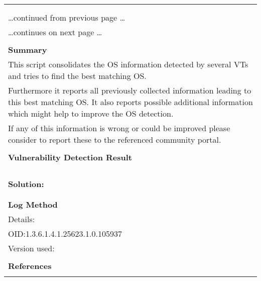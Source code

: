 \documentclass{article}
\begin{document}
\begin{longtable}{|p{}|}
\hline
\rowcolor{gvm_log}{\color{white}{Log (CVSS: 0.0) }}\\
\rowcolor{gvm_log}{\color{white}{NVT: OS Detection Consolidation and Reporting}}\\
\hline
\endfirsthead
\hfill\ldots continued from previous page \ldots \\
\hline
\endhead
\hline
\ldots continues on next page \ldots \\
\endfoot
\hline
\endlastfoot
\\
\textbf{Summary}\\
This script consolidates the OS information detected by several
  VTs and tries to find the best matching OS.\\
  Furthermore it reports all previously collected information leading to this best matching OS. It
  also reports possible additional information which might help to improve the OS detection.\\
  If any of this information is wrong or could be improved please consider to report these to the
  referenced community portal.\\

        \hline
        \\
\textbf{Vulnerability Detection Result}\\
\rowcolor{white}{\verb=No Best matching OS identified. Please see the VT 'Unknown OS and Service Banner=}\\
\rowcolor{white}{$\hookrightarrow$\verb= Reporting' (OID: 1.3.6.1.4.1.25623.1.0.108441) for possible ways to identify =}\\
\rowcolor{white}{$\hookrightarrow$\verb=this OS.=}\\

          \hline
          \\
\textbf{Solution:}\\
\\


        \hline
        \\
\textbf{Log Method}\\
Details:
\rowcolor{white}{\verb=OS Detection Consolidation and Reporting=}\\
OID:1.3.6.1.4.1.25623.1.0.105937\\
Version used:
\rowcolor{white}{\verb=2022-04-05T09:27:51Z=}\\

      \hline
      \\
\textbf{References}\\
\rowcolor{white}{\verb=url: https://community.greenbone.net/c/vulnerability-tests=}\\
\end{longtable}
\end{document}
